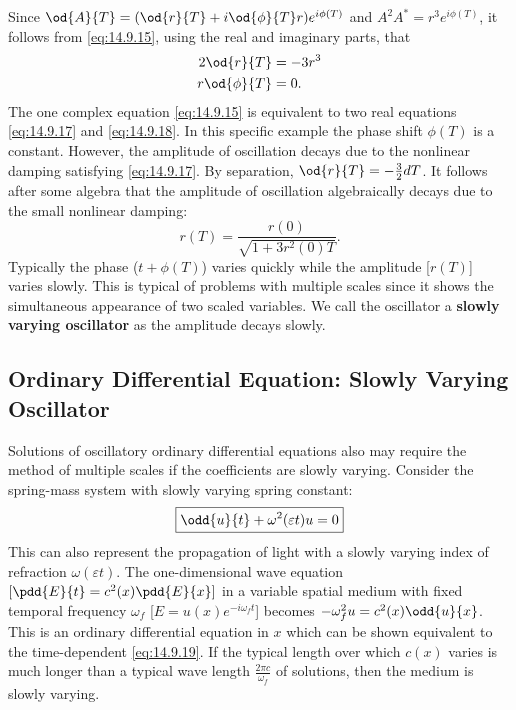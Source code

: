 Since $\od{A}{T} = (\od{r}{T} + i\od{\phi}{T}r)e^{i\phi(T)}$ and $A^2A^* = r^3 e^{i\phi(T)}$, it follows from \eqref{eq:14.9.15}, using the real and imaginary parts, that
\begin{align}
2\od{r}{T} &= -3r^3 \label{eq:14.9.17} \\
r\od{\phi}{T} &= 0. \label{eq:14.9.18}
\end{align}
The one complex equation \eqref{eq:14.9.15} is equivalent to two real equations \eqref{eq:14.9.17} and \eqref{eq:14.9.18}. In this specific example the phase shift $\phi(T)$ is a constant. However, the amplitude of oscillation decays due to the nonlinear damping satisfying \eqref{eq:14.9.17}. By separation, $\od{r}{T} = -\frac{3}{2}dT$. It follows after some algebra that the amplitude of oscillation algebraically decays due to the small nonlinear damping:
\begin{equation}
\boxed{r(T) = \frac{r(0)}{\sqrt{1 + 3r^2(0)T}}.}
\end{equation}
Typically the phase ($t + \phi(T)$) varies quickly while the amplitude [$r(T)$] varies slowly. This is typical of problems with multiple scales since it shows the simultaneous appearance of two scaled variables. We call the oscillator a \textbf{slowly varying oscillator} as the amplitude decays slowly.

\subsection{Ordinary Differential Equation: Slowly Varying Oscillator}
\label{subsec:14.9.2}

Solutions of oscillatory ordinary differential equations also may require the method of multiple scales if the coefficients are slowly varying. Consider the spring-mass system with slowly varying spring constant:
\begin{equation}
\boxed{\odd{u}{t} + \omega^2(\varepsilon t)u = 0}
\label{eq:14.9.19}
\end{equation}
This can also represent the propagation of light with a slowly varying index of refraction $\omega(\varepsilon t)$. The one-dimensional wave equation $[\pdd{E}{t} = c^2(x)\pdd{E}{x}]$ in a variable spatial medium with fixed temporal frequency $\omega_f$ [$E = u(x)e^{-i\omega_f t}$] becomes $-\omega_f^2 u = c^2(x)\odd{u}{x}$. This is an ordinary differential equation in $x$ which can be shown equivalent to the time-dependent \eqref{eq:14.9.19}. If the typical length over which $c(x)$ varies is much longer than a typical wave length $\frac{2\pi c}{\omega_f}$ of solutions, then the medium is slowly varying.

